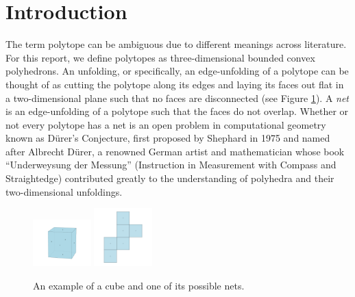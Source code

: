 \documentclass[conference]{IEEEtran}
\renewcommand{\u}{\"{u}}
\begin{document}
\section{Introduction}
The term polytope can be ambiguous due to different meanings across literature. For this report, we define polytopes as three-dimensional bounded convex polyhedrons. An unfolding, or specifically, an edge-unfolding of a polytope can be thought of as cutting the polytope along its edges and laying its faces out flat in a two-dimensional plane such that no faces are disconnected (see Figure \ref{fig:example1}). A \emph{net} is an edge-unfolding of a polytope such that the faces do not overlap. Whether or not every polytope has a net is an open problem in computational geometry known as D\u rer's Conjecture, first proposed by Shephard in 1975 and named after Albrecht D\u rer, a renowned German artist and mathematician whose book ``Underweysung der Messung'' (Instruction in Measurement with Compass and Straightedge) contributed greatly to the understanding of polyhedra and their two-dimensional unfoldings.

\begin{figure}[!h]
    \centering
    \includegraphics[width=0.2\textwidth]{figures/ex1cube.png}
    \includegraphics[width=0.2\textwidth]{figures/ex1cubeunfolding2.png} 
    \caption{An example of a cube and one of its possible nets.}
    \label{fig:example1}
\end{figure}
\end{document}
